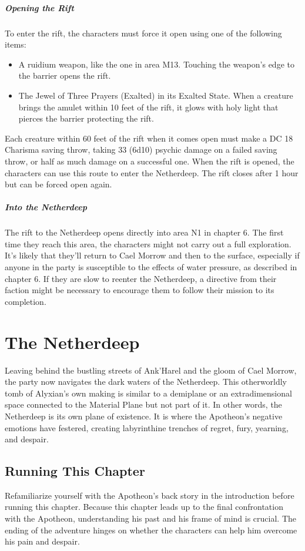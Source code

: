 \documentclass[10pt,a4,twoside,twocolumn,openany,nodeprecatedcode]{dndbook}
\begin{document}
\paragraph{Opening the Rift}
To enter the rift, the characters must force it open using one of the following items:
\begin{itemize}

\item A ruidium weapon, like the one in area M13. Touching the weapon's edge to the barrier opens the rift.
\item The Jewel of Three Prayers (Exalted) in its Exalted State. When a creature brings the amulet within 10 feet of the rift, it glows with holy light that pierces the barrier protecting the rift.
\end{itemize}


Each creature within 60 feet of the rift when it comes open must make a DC 18 Charisma saving throw, taking 33 (6d10) psychic damage on a failed saving throw, or half as much damage on a successful one.
When the rift is opened, the characters can use this route to enter the Netherdeep. The rift closes after 1 hour but can be forced open again.
\paragraph{Into the Netherdeep}
The rift to the Netherdeep opens directly into area N1 in chapter 6. The first time they reach this area, the characters might not carry out a full exploration. It's likely that they'll return to Cael Morrow and then to the surface, especially if anyone in the party is susceptible to the effects of water pressure, as described in chapter 6. If they are slow to reenter the Netherdeep, a directive from their faction might be necessary to encourage them to follow their mission to its completion.
\chapter{The Netherdeep}
Leaving behind the bustling streets of Ank'Harel and the gloom of Cael Morrow, the party now navigates the dark waters of the Netherdeep. This otherworldly tomb of Alyxian's own making is similar to a demiplane or an extradimensional space connected to the Material Plane but not part of it. In other words, the Netherdeep is its own plane of existence. It is where the Apotheon's negative emotions have festered, creating labyrinthine trenches of regret, fury, yearning, and despair.
\section{Running This Chapter}
Refamiliarize yourself with the Apotheon's back story in the introduction before running this chapter. Because this chapter leads up to the final confrontation with the Apotheon, understanding his past and his frame of mind is crucial. The ending of the adventure hinges on whether the characters can help him overcome his pain and despair.
\end{document}
